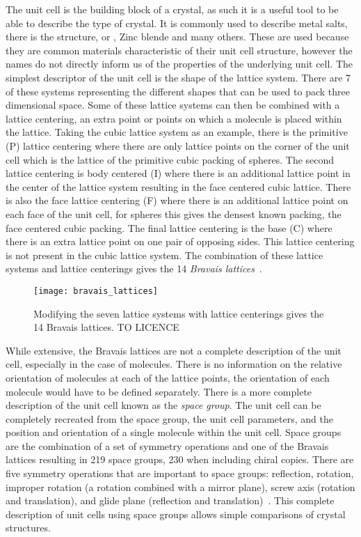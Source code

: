 The unit cell is the building block of a crystal, as such it is a useful tool to be able to describe the type of crystal. It is commonly used to describe metal salts, there is the  structure, or , Zinc blende and many others. These are used because they are common materials characteristic of their unit cell structure, however the names do not directly inform us of the properties of the underlying unit cell. The simplest descriptor of the unit cell is the shape of the lattice system. There are 7 of these systems representing the different shapes that can be used to pack three dimensional space. Some of these lattice systems can then be combined with a lattice centering, an extra point or points on which a molecule is placed within the lattice. Taking the cubic lattice system as an example, there is the primitive (P) lattice centering where there are only lattice points on the corner of the unit cell which is the lattice of the primitive cubic packing of spheres. The second lattice centering is body centered (I) where there is an additional lattice point in the center of the lattice system resulting in the face centered cubic lattice. There is also the face lattice centering (F) where there is an additional lattice point on each face of the unit cell, for spheres this gives the densest known packing, the face centered cubic packing. The final lattice centering is the base (C) where there is an extra lattice point on one pair of opposing sides. This lattice centering is not present in the cubic lattice system. The combination of these lattice systems and lattice centerings gives the 14 \emph{Bravais lattices}~. 

\begin{figure}
    \texttt{[image: bravais\_lattices]}
    \caption{Modifying the seven lattice systems with lattice centerings gives the 14 Bravais lattices. TO LICENCE}
    \label{fig:bravais}
\end{figure}

While extensive, the Bravais lattices are not a complete description of the unit cell, especially in the case of molecules. There is no information on the relative orientation of molecules at each of the lattice points, the orientation of each molecule would have to be defined separately. There is a more complete description of the unit cell known as the \emph{space group}. The unit cell can be completely recreated from the space group, the unit cell parameters, and the position and orientation of a single molecule within the unit cell. Space groups are the combination of a set of symmetry operations and one of the Bravais lattices resulting in 219 space groups, 230 when including chiral copies. There are five symmetry operations that are important to space groups: reflection, rotation, improper rotation (a rotation combined with a mirror plane), screw axis (rotation and translation), and glide plane (reflection and translation)~. This complete description of unit cells using space groups allows simple comparisons of crystal structures.


